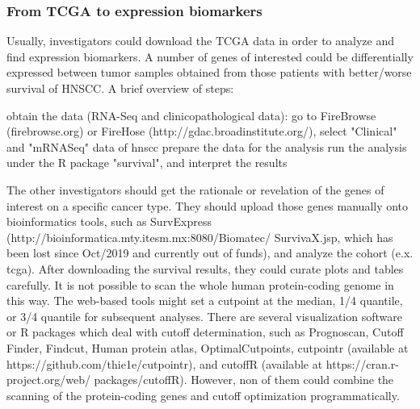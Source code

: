 \documentclass[jpm,article,submit,moreauthors,pdftex]{Definitions/mdpi}
\newenvironment{MyColorPar}[1]{%
    \leavevmode\color{#1}\ignorespaces%
}{%
}%
\begin{document}
\begin{MyColorPar}{red}
\subsubsection{From TCGA to expression biomarkers}
Usually, investigators could download the TCGA data in order to analyze and find expression biomarkers.
A number of genes of interested could be differentially expressed between tumor samples obtained from those patients with better/worse survival of HNSCC.
A brief overview of steps:
\begin{outline}
\1 obtain the data (RNA-Seq and clinicopathological data): go to FireBrowse (firebrowse.org) or FireHose (http://gdac.broadinstitute.org/), select "Clinical" and "mRNASeq" data of \acrfull{hnscc}
\1 prepare the data for the analysis
\1 run the analysis under the R package "survival", and interpret the results
\end{outline}

The other investigators should get the rationale or revelation of the genes of interest on a specific cancer type. They should upload those genes manually onto bioinformatics tools, such as SurvExpress (http://bioinformatica.mty.itesm.mx:8080/Biomatec/ \newline
SurvivaX.jsp\cite{Aguirre-Gamboa2013}, which has been lost since Oct/2019 and currently out of funds), and analyze the cohort (e.x. \acrshort{tcga}). After downloading the survival results, they could curate plots and tables carefully.
It is not possible to scan the whole human protein-coding genome in this way.
The web-based tools might set a cutpoint at the median, 1/4 quantile, or 3/4 quantile for subsequent analyses. There are several visualization software or R packages which deal with cutoff determination\cite{Abel1984}, %
such as Prognoscan\cite{Mizuno2009a}, Cutoff Finder\cite{Budczies2012}, Findcut\cite{Chang2017a}, Human protein atlas\cite{Uhlen2017}, OptimalCutpoints\cite{Cristina2019},  cutpointr (available at https://github.com/thie1e/cutpointr), and cutoffR (available at https://cran.r-project.org/web/
packages/cutoffR). However, non of them could combine the scanning of the protein-coding genes and cutoff optimization programmatically.

\end{MyColorPar}
\end{document}
